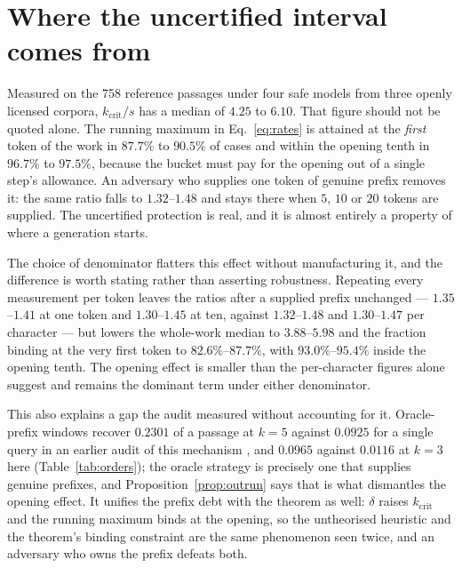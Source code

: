 \section{Where the uncertified interval comes from}\label{app:opening}

Measured on the 758 reference passages under four safe models from three openly licensed corpora,
$k_{\mathrm{crit}}/s$ has a median of $4.25$ to $6.10$. That figure should not be quoted alone. The
running maximum in Eq.~\eqref{eq:rates} is attained at the \emph{first} token of the work in
$87.7\%$ to $90.5\%$ of cases and within the opening tenth in $96.7\%$ to $97.5\%$, because the
bucket must pay for the opening out of a single step's allowance. An adversary who supplies one
token of genuine prefix removes it: the same ratio falls to $1.32$--$1.48$ and stays there when
$5$, $10$ or $20$ tokens are supplied. The uncertified protection is real, and it is almost
entirely a property of where a generation starts.

The choice of denominator flatters this effect without manufacturing it, and the difference is
worth stating rather than asserting robustness. Repeating every measurement per token leaves the
ratios after a supplied prefix unchanged --- $1.35$--$1.41$ at one token and $1.30$--$1.45$ at ten,
against $1.32$--$1.48$ and $1.30$--$1.47$ per character --- but lowers the whole-work median to
$3.88$--$5.98$ and the fraction binding at the very first token to $82.6\%$--$87.7\%$, with
$93.0\%$--$95.4\%$ inside the opening tenth. The opening effect is smaller than the per-character
figures alone suggest and remains the dominant term under either denominator.

This also explains a gap the audit measured without accounting for it. Oracle-prefix windows
recover $0.2301$ of a passage at $k=5$ against $0.0925$ for a single query in an earlier audit of
this mechanism \citep{vijayavallabh2026audit}, and $0.0965$ against $0.0116$ at $k=3$ here
(Table~\ref{tab:orders}); the oracle strategy is precisely one that supplies genuine prefixes,
and Proposition~\ref{prop:outrun} says that is what dismantles the opening effect. It unifies the
prefix debt with the theorem as well: $\delta$ raises $k_{\mathrm{crit}}$ and the running maximum
binds at the opening, so the untheorised heuristic and the theorem's binding constraint are the
same phenomenon seen twice, and an adversary who owns the prefix defeats both.



